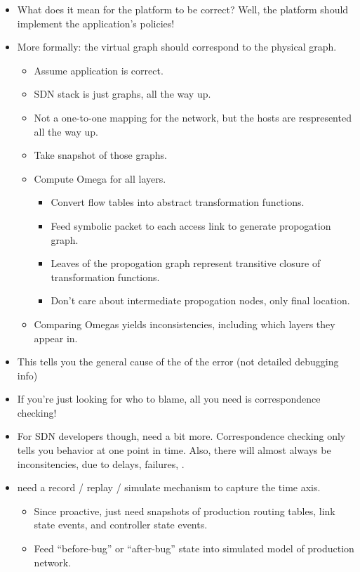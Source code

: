 \begin{itemize}
\item What does it mean for the platform to be correct? Well, the platform
should implement the application's policies!
\item More formally: the virtual graph should correspond to the physical
graph.
    \begin{itemize}
    \item Assume application is correct.
    \item SDN stack is just graphs, all the way up.
    \item Not a one-to-one mapping for the network, but the hosts are respresented all the way
    up.
    \item Take snapshot of those graphs.
    \item Compute Omega for all layers.
        \begin{itemize}
        \item Convert flow tables into abstract transformation functions.
        \item Feed symbolic packet to each access link to generate
        propogation graph.
        \item Leaves of the propogation graph represent transitive closure of
        transformation functions.
        \item Don't care about intermediate propogation nodes, only final
        location.
        \end{itemize}
    \item Comparing Omegas yields inconsistencies, including which layers
    they appear in.
    \end{itemize}
\item This tells you the general cause of the of the error (not detailed
debugging info)
\item If you're just looking for who to blame, all you need is correspondence
checking!
\item For SDN developers though, need a bit more. Correspondence checking only tells you behavior at one point in time.
Also, there will almost always be inconsitencies, due to delays, failures,
\etc.
\item {} need a record / replay / simulate mechanism to capture the time axis.
    \begin{itemize}
    \item Since proactive, just need snapshots of production routing tables,
    link state events, and controller state events.
    \item Feed ``before-bug'' or ``after-bug'' state into simulated model of production network. 

\end{itemize}
\end{itemize}
